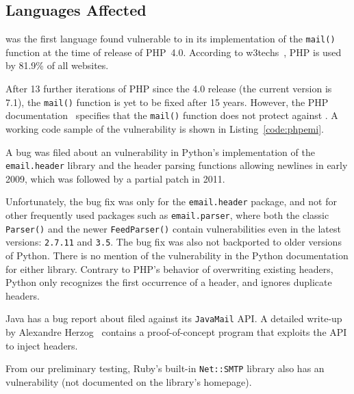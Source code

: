 \subsection{Languages Affected}
\label{languages}
 was the first language found vulnerable to \ehi in its implementation of the \texttt{mail()} function at the time of release of PHP~4.0. According to w3techs~\cite{W3techs}, PHP is used by 81.9\% of all websites.

After 13 further iterations of PHP since the 4.0 release (the current
version is 7.1), the \texttt{mail()} function is yet to be fixed after
15 years. However, the PHP documentation~\cite{PHPDocs} specifies that the \texttt{mail()} function does not protect against \ehi.
A working code sample of the vulnerability is shown in  Listing~\ref{code:phpemi}.

\begin{sloppypar}
A bug was filed about an \ehi vulnerability in Python's implementation of the \texttt{email.header} library and the header parsing functions allowing newlines in early 2009, which was followed by a partial patch in 2011.
\end{sloppypar}

Unfortunately, the bug fix was only for the \texttt{email.header} package, and not for other frequently used packages such as \texttt{email.parser}, where both the classic \texttt{Parser()} and the newer \texttt{FeedParser()} contain \ehi vulnerabilities even in the latest versions: \texttt{2.7.11} and \texttt{3.5}. The bug fix was also not backported to older versions of Python.
There is no mention of the vulnerability in the Python documentation for either library. Contrary to PHP's behavior of overwriting existing headers, Python only recognizes the first occurrence of a header, and ignores duplicate headers.


%

Java has a bug report about \ehi filed against its \texttt{JavaMail} API. A detailed write-up by Alexandre Herzog~\cite{Herzog.2014} contains a proof-of-concept program that exploits the API to inject headers.

\begin{sloppypar}
From our preliminary testing, Ruby's built-in \texttt{Net::SMTP} library also has an \ehi vulnerability (not documented on the library's homepage).
\end{sloppypar}
%


